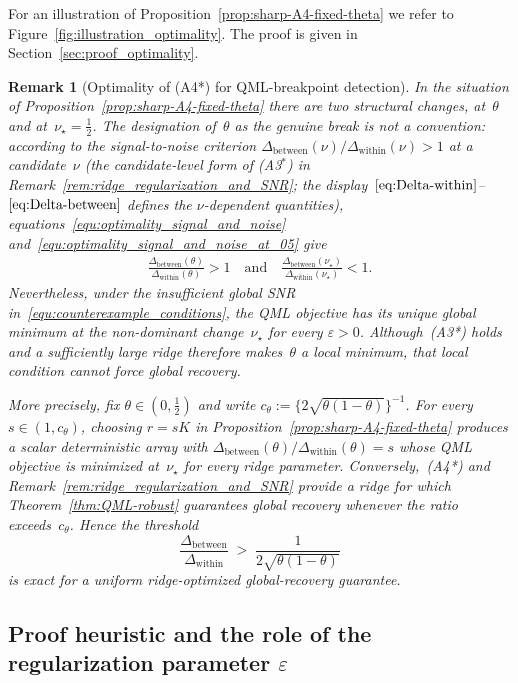 \documentclass[10pt, letterpaper]{amsart}
\newtheorem{remark}[theorem]{Remark}
\begin{document}
For an illustration of Proposition~\ref{prop:sharp-A4-fixed-theta} we refer to Figure~\ref{fig:illustration_optimality}. The proof is given in Section~\ref{sec:proof_optimality}.
\begin{remark}[Optimality of (A4*) for QML-breakpoint detection]
\label{rem:sharp-A4-fixed-theta}
In the situation of
Proposition~\ref{prop:sharp-A4-fixed-theta} there are two structural changes,
at~$\theta$ and at~$\nu_\star=\tfrac12$. The designation of~$\theta$ as the
genuine break is not a convention: according to the
signal-to-noise criterion $\Delta_{\mathrm{between}}(\nu)/\Delta_{\mathrm{within}}(\nu)>1$ at a candidate~$\nu$ (the candidate-level form of \textup{(A3$^\ast$)} in Remark~\ref{rem:ridge_regularization_and_SNR}; the display~$\eqref{eq:Delta-within}$--$\eqref{eq:Delta-between}$ defines the $\nu$-dependent quantities),
equations~\eqref{equ:optimality_signal_and_noise}
and~\eqref{equ:optimality_signal_and_noise_at_05} give
\begin{align}
  \frac{\Delta_{\mathrm{between}} (\theta)}{\Delta_{\mathrm{within}} (\theta)} >1
  \quad \mbox{and} \quad
  \frac{\Delta_{\mathrm{between}} (\nu_\star)}
       {\Delta_{\mathrm{within}} (\nu_\star)} < 1.
\end{align}
Nevertheless, under the insufficient global SNR
in~\eqref{equ:counterexample_conditions}, the QML objective has its unique
global minimum at the non-dominant change~$\nu_\star$ for every
$\varepsilon>0$. Although~\textup{(A3*)} holds and a sufficiently large ridge
therefore makes~$\theta$ a local minimum, that local condition cannot force
global recovery.

More precisely, fix $\theta\in(0,\tfrac12)$ and write
$c_\theta:=\{2\sqrt{\theta(1-\theta)}\}^{-1}$. For every
$s\in(1,c_\theta)$, choosing $r=sK$ in
Proposition~\ref{prop:sharp-A4-fixed-theta} produces a scalar deterministic
array with
$\Delta_{\mathrm{between}}(\theta)/\Delta_{\mathrm{within}}(\theta)=s$
whose QML objective is minimized at~$\nu_\star$ for every ridge parameter.
Conversely,~\textup{(A4*)} and
Remark~\ref{rem:ridge_regularization_and_SNR} provide a ridge for which
Theorem~\ref{thm:QML-robust} guarantees global recovery whenever the ratio
exceeds~$c_\theta$. Hence the threshold
\[
\frac{\Delta_{\mathrm{between}}}{\Delta_{\mathrm{within}}}\;>\;\frac{1}{2\sqrt{\theta(1-\theta)}}
\]
is exact for a uniform ridge-optimized global-recovery
guarantee.
\end{remark}

\subsection{Proof heuristic and the role of the regularization parameter $\varepsilon$}
\label{subsec:heuristic-eps}
\end{document}
